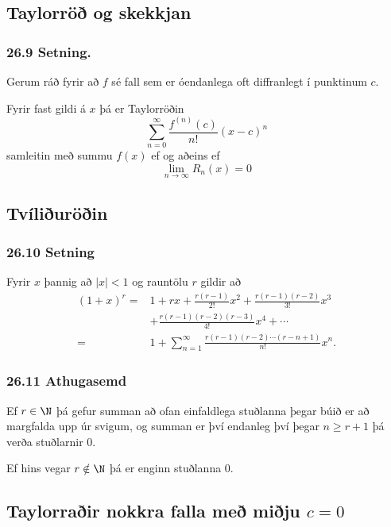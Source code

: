 \subsection[t]{Taylorröð og skekkjan}
 \subsubsection{26.9 Setning.}  Gerum ráð fyrir að $f$ sé fall sem er óendanlega
oft diffranlegt í punktinum $c$. 
\pause

Fyrir fast gildi á $x$ þá er Taylorröðin 
$$
\sum_{n=0}^\infty
\frac{f^{(n)}(c)}{n!}(x-c)^n
$$ samleitin með summu $f(x)$ \pause ef og aðeins
ef $$\lim_{n\rightarrow\infty}R_n(x)=0$$



\subsection[t]{Tvíliðuröðin}
 \subsubsection{26.10 Setning}
Fyrir $x$ þannig að $|x|<1$ og rauntölu $r$ gildir að \pause
\begin{align*}
(1+x)^r =& 1+rx+\frac{r(r-1)}{2!}x^2+
\frac{r(r-1)(r-2)}{3!}x^3 \\ 
&+\frac{r(r-1)(r-2)(r-3)}{4!}x^4+\cdots\\
=& 1+ \sum_{n=1}^\infty \frac{r(r-1)(r-2)\cdots(r-n+1)}{n!}x^n.
\end{align*}
\pause
\subsubsection{26.11 Athugasemd}
 Ef $r \in \N$ þá gefur summan að ofan einfaldlega stuðlanna þegar búið er að 
margfalda upp úr svigum, og summan er því endanleg því þegar $n \geq r+1$ þá
verða stuðlarnir 0.
\pause

Ef hins vegar $r\notin \N$ þá er enginn stuðlanna 0.





\subsection[t]{Taylorraðir nokkra falla með miðju $c=0$}
